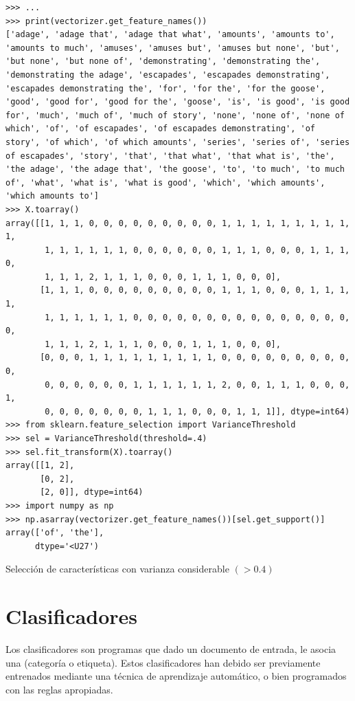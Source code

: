 \begin{listing}[htbp]
\begin{verbatim}
>>> ...
>>> print(vectorizer.get_feature_names())
['adage', 'adage that', 'adage that what', 'amounts', 'amounts to', 'amounts to much', 'amuses', 'amuses but', 'amuses but none', 'but', 'but none', 'but none of', 'demonstrating', 'demonstrating the', 'demonstrating the adage', 'escapades', 'escapades demonstrating', 'escapades demonstrating the', 'for', 'for the', 'for the goose', 'good', 'good for', 'good for the', 'goose', 'is', 'is good', 'is good for', 'much', 'much of', 'much of story', 'none', 'none of', 'none of which', 'of', 'of escapades', 'of escapades demonstrating', 'of story', 'of which', 'of which amounts', 'series', 'series of', 'series of escapades', 'story', 'that', 'that what', 'that what is', 'the', 'the adage', 'the adage that', 'the goose', 'to', 'to much', 'to much of', 'what', 'what is', 'what is good', 'which', 'which amounts', 'which amounts to']
>>> X.toarray()
array([[1, 1, 1, 0, 0, 0, 0, 0, 0, 0, 0, 0, 1, 1, 1, 1, 1, 1, 1, 1, 1, 1,
        1, 1, 1, 1, 1, 1, 0, 0, 0, 0, 0, 0, 1, 1, 1, 0, 0, 0, 1, 1, 1, 0,
        1, 1, 1, 2, 1, 1, 1, 0, 0, 0, 1, 1, 1, 0, 0, 0],
       [1, 1, 1, 0, 0, 0, 0, 0, 0, 0, 0, 0, 1, 1, 1, 0, 0, 0, 1, 1, 1, 1,
        1, 1, 1, 1, 1, 1, 0, 0, 0, 0, 0, 0, 0, 0, 0, 0, 0, 0, 0, 0, 0, 0,
        1, 1, 1, 2, 1, 1, 1, 0, 0, 0, 1, 1, 1, 0, 0, 0],
       [0, 0, 0, 1, 1, 1, 1, 1, 1, 1, 1, 1, 0, 0, 0, 0, 0, 0, 0, 0, 0, 0,
        0, 0, 0, 0, 0, 0, 1, 1, 1, 1, 1, 1, 2, 0, 0, 1, 1, 1, 0, 0, 0, 1,
        0, 0, 0, 0, 0, 0, 0, 1, 1, 1, 0, 0, 0, 1, 1, 1]], dtype=int64)
>>> from sklearn.feature_selection import VarianceThreshold
>>> sel = VarianceThreshold(threshold=.4)
>>> sel.fit_transform(X).toarray()
array([[1, 2],
       [0, 2],
       [2, 0]], dtype=int64)
>>> import numpy as np
>>> np.asarray(vectorizer.get_feature_names())[sel.get_support()]
array(['of', 'the'], 
      dtype='<U27')
\end{verbatim}
\caption{Selección de características con varianza considerable $(> 0.4)$}
\label{lst:feature-selection}
\end{listing}


\section{Clasificadores}

Los clasificadores son programas que dado un documento de entrada, le asocia una  (categoría o etiqueta). Estos clasificadores han debido ser previamente entrenados mediante una técnica de aprendizaje automático, o bien programados con las reglas apropiadas.

